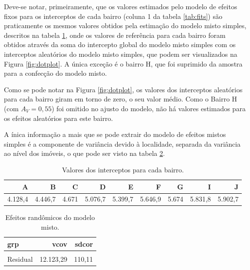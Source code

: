 \documentclass[
  a4paper, 11pt]{article}
\begin{document}
Deve-se notar, primeiramente, que os valores estimados pelo modelo de
efeitos fixos para os interceptos de cada bairro (coluna 1 da tabela
\ref{tab:fits}) são praticamente os mesmos valores obtidos pela
estimação do modelo misto simples, descritos na tabela
\ref{tab:somaitcpt}, onde os valores de referência para cada bairro
foram obtidos através da soma do intercepto global do modelo misto
simples com os interceptos aleatórios do modelo misto simples, que podem
ser visualizados na Figura \ref{fig:dotplot}. A única exceção é o bairro
H, que foi suprimido da amostra para a confecção do modelo misto.

Como se pode notar na Figura \ref{fig:dotplot}, os valores dos
interceptos aleatórios para cada bairro giram em torno de zero, o seu
valor médio. Como o Bairro H (com \(A_V = 0,55\)) foi omitido no ajusto
do modelo, não há valores estimados para os efeitos aleatórios para este
bairro.

A ínica informação a mais que se pode extrair do modelo de efeitos
mistos simples é a componente de variância devido à localidade, separada
da variância ao nível dos imóveis, o que pode ser visto na tabela
\ref{tab:variancias}.

\begin{table}[H]

\caption{\label{tab:somaitcpt}Valores dos interceptos para cada bairro.}
\centering
\fontsize{10}{12}\selectfont
\begin{tabular}[t]{rrrrrrrrr}
\toprule
A & B & C & D & E & F & G & I & J\\
\midrule
4.128,4 & 4.446,7 & 4.671 & 5.076,7 & 5.399,7 & 5.646,9 & 5.674 & 5.831,8 & 5.902,7\\
\bottomrule
\end{tabular}
\end{table}

\begin{table}[H]

\caption{\label{tab:variancias}Efeitos randômicos do modelo misto.}
\centering
\begin{tabular}[t]{lrr}
\toprule
grp & vcov & sdcor\\
\midrule
\cellcolor{gray!6}{Bairro} & \cellcolor{gray!6}{421.256,03} & \cellcolor{gray!6}{649,04}\\
Residual & 12.123,29 & 110,11\\
\bottomrule
\end{tabular}
\end{table}
\end{document}
